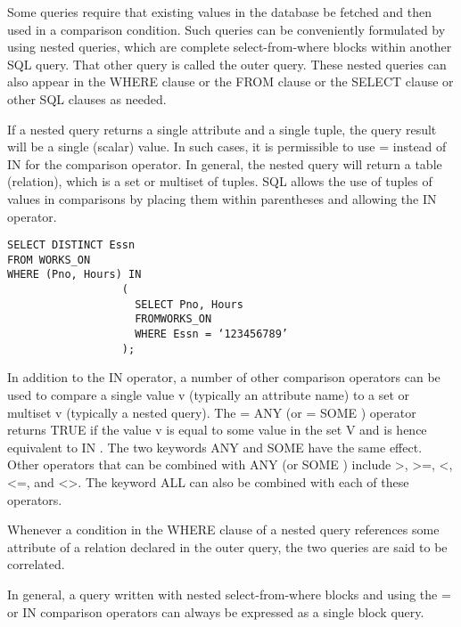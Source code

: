     \par Some queries require that existing values in the database be fetched and then used in a comparison condition. Such queries can be conveniently formulated by using nested queries, which are complete select-from-where blocks within another SQL query. That other query is called the outer query. These nested queries can also appear in the WHERE clause or the FROM clause or the SELECT clause or other SQL clauses as needed.
    \par If a nested query returns a single attribute and a single tuple, the query result will be a single (scalar) value. In such cases, it is permissible to use = instead of IN for the comparison operator. In general, the nested query will return a table (relation), which is a set or multiset of tuples. SQL allows the use of tuples of values in comparisons by placing them within
    parentheses and allowing the IN operator.
    \begin{lstlisting}
SELECT DISTINCT Essn
FROM WORKS_ON
WHERE (Pno, Hours) IN
                  (
                    SELECT Pno, Hours
                    FROMWORKS_ON
                    WHERE Essn = ‘123456789’
                  );
    \end{lstlisting}
    \par In addition to the IN operator, a number of other comparison operators can be used to compare a single value v (typically an attribute name) to a set or multiset v (typically a nested query). The = ANY (or = SOME ) operator returns TRUE if the value v is equal to some value in the set V and is hence equivalent to IN . The two keywords ANY and SOME have the same effect. Other operators that can be combined with ANY (or SOME ) include >, >=, <, <=, and <>. The keyword ALL can also be combined with each of these operators.

    \par Whenever a condition in the WHERE clause of a nested query references some attribute of a relation declared in the outer query, the two queries are said to be correlated.
    \par In general, a query written with nested select-from-where blocks and using the = or IN comparison operators can always be expressed as a single block query.

